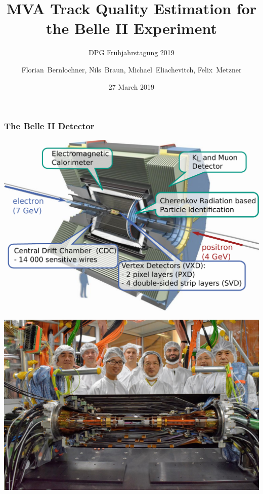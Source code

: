 \documentclass[18pt, aspectratio=169]{beamer}
\title{MVA Track Quality Estimation for the Belle II Experiment}
\subtitle{DPG Frühjahrstagung 2019}
\author[Michael Eliachevitch]{Florian~Bernlochner, Nils~Braun,
  \textbullet{}Michael~Eliachevitch, Felix~Metzner}
\institute{ETP -- KIT}
\date{27 March 2019}
\begin{document}
\begin{frame}
  \titlepage
\end{frame}
\begin{frame}
  \frametitle{The Belle II Detector}
  \begin{center}
    \includegraphics[width=.75\textwidth]{figures/belle2_detector_dpgaachen.pdf}
  \end{center}
\end{frame}
\begin{frame}[plain]
  \begin{center}
    \includegraphics[width=.8\textwidth]{figures/vertexdetector.jpg}
  \end{center}
\end{frame}
\end{document}

